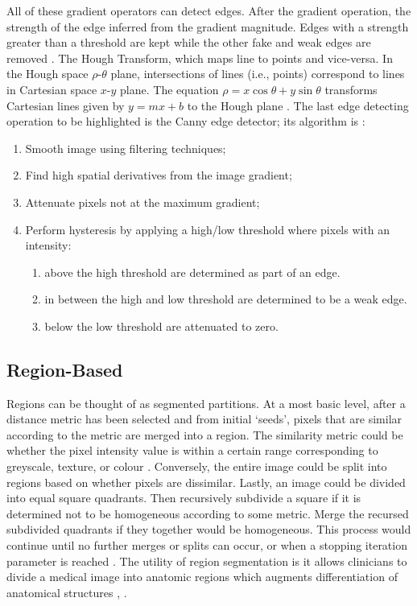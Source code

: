 \documentclass{bmcart}
\begin{document}
\par All of these gradient operators can detect edges. After the gradient operation, the strength of the edge inferred from the gradient magnitude. Edges with a strength greater than a threshold are kept while the other fake and weak edges are removed \cite{sharma_automated_2010}. The Hough Transform, which maps line to points and vice-versa. In the Hough space $\rho$-$\theta$ plane, intersections of lines  (i.e., points) correspond to lines in Cartesian space $x$-$y$ plane. The equation $\rho=x\cos\theta + y\sin\theta$ transforms Cartesian lines given by $y=mx+b$ to the Hough plane \cite{banik_landmarking_2009}. The last edge detecting operation to be highlighted is the Canny edge detector; its algorithm is \cite{rafati_comparison_2014}:
\begin{enumerate}
    \item Smooth image using filtering techniques;
    \item Find high spatial derivatives from the image gradient;
    \item Attenuate pixels not at the maximum gradient;
    \item Perform hysteresis by applying a high/low threshold where pixels with an intensity:
    \begin{enumerate}
        \item above the high threshold are determined as part of an edge.
        \item in between the high and low threshold are determined to be a weak edge.
        \item below the low threshold are attenuated to zero.
    \end{enumerate}
\end{enumerate}
\subsection*{Region-Based}
Regions can be thought of as segmented partitions. At a most basic level, after a distance metric has been selected and from initial `seeds', pixels that are similar according to the metric are merged into a region. The similarity metric could be whether the pixel intensity value is within a certain range corresponding to greyscale, texture, or colour \cite{banik_landmarking_2009}. Conversely, the entire image could be split into regions based on whether pixels are dissimilar. Lastly, an image could be divided into equal square quadrants. Then recursively subdivide a square if it is determined not to be homogeneous according to some metric. Merge the recursed subdivided quadrants if they together would be homogeneous. This process would continue until no further merges or splits can occur, or when a stopping iteration parameter is reached \cite{sharma_automated_2010}. The utility of region segmentation is it allows clinicians to divide a medical image into anatomic regions which augments differentiation of anatomical structures \cite{van_ginneken_computer-aided_2011}, \cite{oliveira_medical_2014}.
\end{document}
